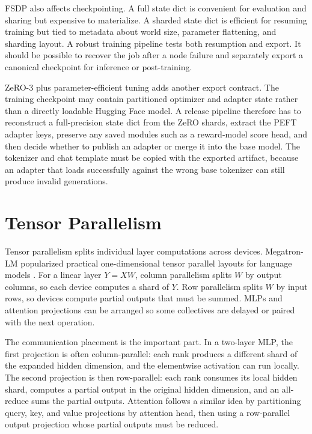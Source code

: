 FSDP also affects checkpointing. A full state dict is convenient for evaluation and sharing but expensive to materialize. A sharded state dict is efficient for resuming training but tied to metadata about world size, parameter flattening, and sharding layout. A robust training pipeline tests both resumption and export. It should be possible to recover the job after a node failure and separately export a canonical checkpoint for inference or post-training.

ZeRO-3 plus parameter-efficient tuning adds another export contract. The training checkpoint may contain partitioned optimizer and adapter state rather than a directly loadable Hugging Face model. A release pipeline therefore has to reconstruct a full-precision state dict from the ZeRO shards, extract the PEFT adapter keys, preserve any saved modules such as a reward-model score head, and then decide whether to publish an adapter or merge it into the base model. The tokenizer and chat template must be copied with the exported artifact, because an adapter that loads successfully against the wrong base tokenizer can still produce invalid generations.

\section{Tensor Parallelism}
\label{sec:tensor-parallelism}

Tensor parallelism splits individual layer computations across devices. Megatron-LM popularized practical one-dimensional tensor parallel layouts for \transformer language models \cite{shoeybi2019megatron}. For a linear layer $Y=XW$, column parallelism splits $W$ by output columns, so each device computes a shard of $Y$. Row parallelism splits $W$ by input rows, so devices compute partial outputs that must be summed. MLPs and attention projections can be arranged so some collectives are delayed or paired with the next operation.

The communication placement is the important part. In a two-layer MLP, the first projection is often column-parallel: each rank produces a different shard of the expanded hidden dimension, and the elementwise activation can run locally. The second projection is then row-parallel: each rank consumes its local hidden shard, computes a partial output in the original hidden dimension, and an all-reduce sums the partial outputs. Attention follows a similar idea by partitioning query, key, and value projections by attention head, then using a row-parallel output projection whose partial outputs must be reduced.

